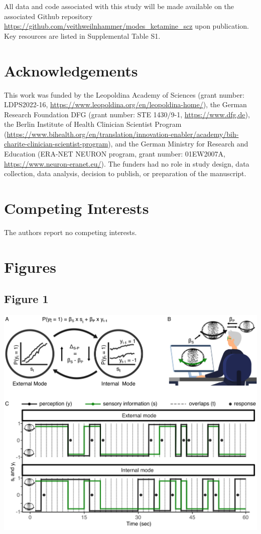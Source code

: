 \documentclass[
]{article}
\begin{document}
All data and code associated with this study will be made available on
the associated Github repository
\url{https://github.com/veithweilnhammer/modes_ketamine_scz} upon
publication. Key resources are listed in Supplemental Table S1.

\section{Acknowledgements}\label{acknowledgements}

This work was funded by the Leopoldina Academy of Sciences (grant
number: LDPS2022-16,
\url{https://www.leopoldina.org/en/leopoldina-home/}), the German
Research Foundation DFG (grant number: STE 1430/9-1,
\url{https://www.dfg.de}), the Berlin Institute of Health Clinician
Scientist Program
(\url{https://www.bihealth.org/en/translation/innovation-enabler/academy/bih-charite-clinician-scientist-program}),
and the German Ministry for Research and Education (ERA-NET NEURON
program, grant number: 01EW2007A, \url{https://www.neuron-eranet.eu/}).
The funders had no role in study design, data collection, data analysis,
decision to publish, or preparation of the manuscript.

\section{Competing Interests}\label{competing-interests}

The authors report no competing interests.

\newpage

\section{Figures}\label{figures}

\subsection{Figure 1}\label{figure-1}

\includegraphics{./modes_ketamine_scz_files/figure-latex/Figure_1.png}
\end{document}
